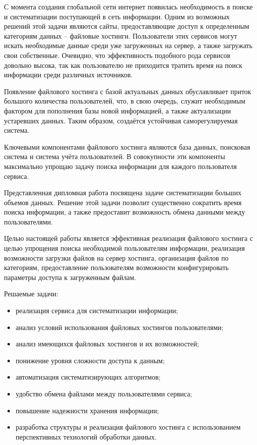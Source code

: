 \label{sec:intro}
С момента создания глобальной сети интернет появилась необходимость в поиске и систематизации поступающей в сеть информации. Одним из возможных решений этой задачи являются сайты, предоставляющие доступ к определенным категориям данных – файловые хостинги. Пользователи этих сервисов могут искать необходимые данные среди уже загруженных на сервер, а также загружать свои собственные. Очевидно, что эффективность подобного рода сервисов довольно высока, так как пользователю не приходится тратить время на поиск информации среди различных источников. 

Появление файлового хостинга с базой актуальных данных обуславливает приток большого количества пользователей, что, в свою очередь, служит необходимым фактором для пополнения базы новой информацией, а также актуализации устаревших данных. Таким образом, создаётся устойчивая саморегулируемая система.

Ключевыми компонентами файлового хостинга являются база данных, поисковая система и система учёта пользователей. В совокупности эти компоненты максимально упрощаю задачу поиска информации для каждого пользователя сервиса.

Представленная дипломная работа посвящена задаче систематизации больших объемов данных. Решение этой задачи позволит существенно сократить время поиска информации, а также предоставит возможность обмена данными между пользователями.

Целью настоящей работы является эффективная реализация файлового хостинга с целью упрощения поиска необходимой пользователям информации, реализация возможности загрузки файлов на сервер хостинга, организация файлов по категориям, предоставление пользователям возможности конфигурировать параметры доступа к загруженным файлам.

Решаемые задачи:
\begin{itemize}
  \item реализация сервиса для систематизации информации;
  \item анализ условий использования файловых хостингов пользователями;
  \item анализ имеющихся файловых хостингов и их возможностей;
  \item понижение уровня сложности доступа к данным;
  \item автоматизация систематизирующих алгоритмов;
  \item удобство обмена файлами между пользователями сервиса;
  \item повышение надежности хранения информации;
  \item разработка структуры и реализация файлового хостинга с использованием перспективных технологий обработки данных.
\end{itemize}

